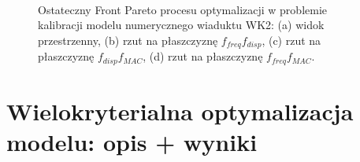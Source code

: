 \begin{figure}[h]
	\centering
	 \\
	\captionsetup{justification=centering}
	\caption{Ostateczny Front Pareto procesu optymalizacji w problemie kalibracji modelu numerycznego wiaduktu WK2: (a) widok przestrzenny, (b) rzut na płaszczyznę $f_{freq}f_{disp}$, (c) rzut na płaszczyznę $f_{disp}f_{MAC}$, (d) rzut na płaszczyznę $f_{freq}f_{MAC}$.}
	\label{fig: calibration_selected}
\end{figure}










\section{Wielokryterialna optymalizacja modelu: opis + wyniki}


